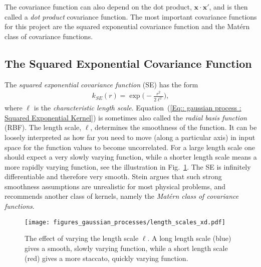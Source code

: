 \documentclass[twoside,english]{uiofysmaster}
\begin{document}
The covariance function can also depend on the dot product, $\textbf{x} \cdot \textbf{x}'$, and is then called a \textit{dot product} covariance function. The most important covariance functions for this project are the squared exponential covariance function and the Mat\'{e}rn class of covariance functions.




\subsection{The Squared Exponential Covariance Function}

The \textit{squared exponential covariance function} (SE) has the form 
\begin{align}\label{Eq:: gaussian process : Squared Exponential Kernel}
k_{SE} (r) = \exp \Big( - \frac{r^2}{2 \ell^2} \Big),
\end{align} 
where $\ell$ is the \textit{characteristic length scale}. Equation~(\ref{Eq:: gaussian process : Squared Exponential Kernel}) is sometimes also called the \textit{radial basis function} (RBF). The length scale, $\ell$, determines the smoothness of the function. It can be loosely interpreted as how far you need to move (along a particular axis) in input space for the function values to become uncorrelated. For a large length scale one should expect a very slowly varying function, while a shorter length scale means a more rapidly varying function, see the illustration in Fig.~\ref{Fig:: gaussian process : ell variation example}. The SE is infinitely differentiable and therefore very smooth. Stein \cite{steininterpolation} argues that such strong smoothness assumptions are unrealistic for most physical problems, and recommends another class of kernels, namely the \textit{Mat\'{e}rn class of covariance functions}.

\begin{figure}
\centering
\texttt{[image: figures\_gaussian\_processes/length\_scales\_xd.pdf]}
\caption{The effect of varying the length scale $\ell$. A long length scale (blue) gives a smooth, slowly varying function, while a short length scale (red) gives a more staccato, quickly varying function.}
\label{Fig:: gaussian process : ell variation example}
\end{figure}

\end{document}
